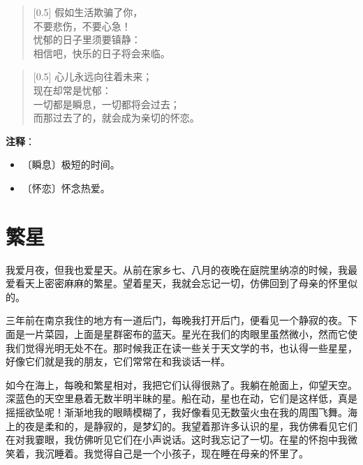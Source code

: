 \documentclass[12pt,UTF-8,openany]{ctexbook}
\begin{document}
\begin{normalsize}
    
    \begin{verse}[0.5\linewidth]
        假如生活欺骗了你， \\
        不要悲伤，不要心急！ \\
        忧郁的日子里须要镇静： \\
        相信吧，快乐的日子将会来临。
    \end{verse}
    
    
    \begin{verse}[0.5\linewidth]
        心儿永远向往着未来； \\
        现在却常是忧郁： \\
        一切都是瞬息，一切都将会过去； \\
        而那过去了的，就会成为亲切的怀恋。
    \end{verse}
    
\end{normalsize}


\newpage

\textbf{注释}：

\vspace{-1em}

\begin{itemize}
    \setlength\itemsep{-0.2em}
    \item 〔瞬息〕极短的时间。
    \item 〔怀恋〕怀念热爱。
\end{itemize}

\chapter{繁星}

\begin{normalsize}
    
    我爱月夜，但我也爱星天。从前在家乡七、八月的夜晚在庭院里纳凉的时候，我最爱看天上密密麻麻的繁星。望着星天，我就会忘记一切，仿佛回到了母亲的怀里似的。
    
    三年前在南京我住的地方有一道后门，每晚我打开后门，便看见一个静寂的夜。下面是一片菜园，上面是星群密布的蓝天。星光在我们的肉眼里虽然微小，然而它使我们觉得光明无处不在。那时候我正在读一些关于天文学的书，也认得一些星星，好像它们就是我的朋友，它们常常在和我谈话一样。
    
    如今在海上，每晚和繁星相对，我把它们认得很熟了。我躺在舱面上，仰望天空。深蓝色的天空里悬着无数半明半昧的星。船在动，星也在动，它们是这样低，真是摇摇欲坠呢！渐渐地我的眼睛模糊了，我好像看见无数萤火虫在我的周围飞舞。海上的夜是柔和的，是静寂的，是梦幻的。我望着那许多认识的星，我仿佛看见它们在对我霎眼，我仿佛听见它们在小声说话。这时我忘记了一切。在星的怀抱中我微笑着，我沉睡着。我觉得自己是一个小孩子，现在睡在母亲的怀里了。
    
\end{normalsize}
\end{document}
